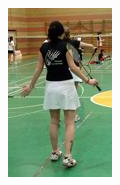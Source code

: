 \begin{figure}[h]
\begin{subfigure}[b]{.15\textwidth}
   \includegraphics[height=4\textwidth / 3]{./images/LSP4}

\end{subfigure}
\end{figure}
